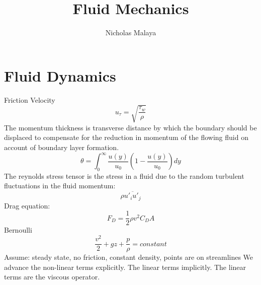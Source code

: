 \documentclass{article}
\title{\bf{Fluid Mechanics}}
\author{Nicholas Malaya} \date{}
\begin{document}
\maketitle

%
%
\newpage
\section{Fluid Dynamics}
Friction Velocity
\begin{equation}
  u_\tau = \sqrt{\frac{\tau_w}{\rho}}
\end{equation}
\newline
\newline
The momentum thickness is transverse distance by which the boundary should be displaced to compensate for the reduction in momentum of the flowing fluid on account of boundary layer formation. 
\begin{equation}
  \theta = \int^\infty_0 \frac{u(y)}{u_0}(1-\frac{u(y)}{u_0})dy
\end{equation}
\newline
\newline
The reynolds stress tensor is the stress in a fluid due to the random turbulent fluctuations in the fluid momentum:
\begin{equation}
  \rho \overline{u'_i u'_j}
\end{equation}
\newline
\newline
Drag equation: 
\begin{equation}
  F_D = \frac{1}{2}\rho v^2 C_D A
\end{equation}
\newline
\newline
Bernoulli 
\begin{equation}
  \frac{v^2}{2}+gz+\frac{p}{\rho}=constant
\end{equation}
\newline
Assume: steady state, no friction, constant density, points are on streamlines
\newline
\newline
We advance the non-linear terms explicitly. The linear terms
implicitly. The linear terms are the viscous operator. 
\end{document}

